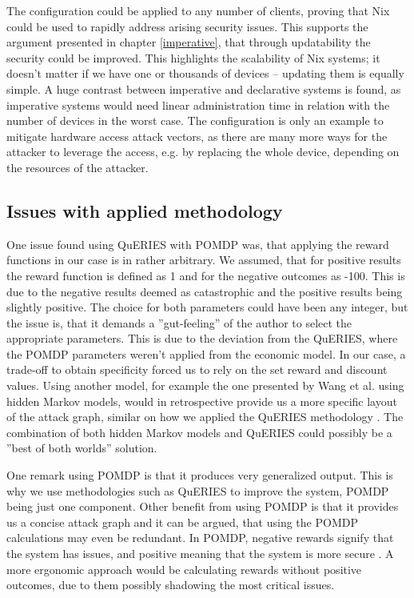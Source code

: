 The configuration could be applied to any number of clients, proving
that Nix could be used to rapidly address arising security
issues. This supports the argument presented in chapter
\ref{imperative}, that through updatability the security could be
improved. This highlights the scalability of Nix systems; it doesn't
matter if we have one or thousands of devices – updating them is
equally simple. A huge contrast between imperative and declarative
systems is found, as imperative systems would need linear
administration time in relation with the number of devices in the worst case. The
configuration is only an example to mitigate hardware access attack
vectors, as there are many more ways for the attacker to leverage the
access, e.g. by replacing the whole device, depending on the resources
of the attacker.

\subsection{Issues with applied methodology} \label{issues}

One issue found using QuERIES with POMDP was, that applying the reward
functions in our case is in rather arbitrary. We assumed, that for
positive results the reward function is defined as 1 and for the
negative outcomes as -100. This is due to the negative results deemed
as catastrophic and the positive results being slightly positive. The
choice for both parameters could have been any integer, but the issue
is, that it demands a ''gut-feeling'' of the author to select the
appropriate parameters. This is due to the deviation from the QuERIES,
where the POMDP parameters weren't applied from the economic model. In our case, a trade-off to obtain
specificity forced us to rely on the set reward and discount
values. Using another model, for example the one presented by Wang
et al. using hidden Markov models, would in retrospective provide us a
more specific layout of the attack graph, similar on how we applied
the QuERIES methodology \cite{wang2010framework}. The
combination of both hidden Markov models and QuERIES could possibly be a ''best
of both worlds'' solution.

One remark using POMDP is that it produces very generalized
output. This is why we use methodologies such as QuERIES to improve
the system, POMDP being just one component. Other benefit from using
POMDP is that it provides us a concise attack graph and it can be argued, that
using the POMDP calculations may even be redundant. In POMDP, negative
rewards signify that the system has issues, and positive meaning that
the system is more secure \cite{mcabeeMarkov}. A more ergonomic approach
would be calculating rewards without positive outcomes, due to them
possibly shadowing the most critical issues.

